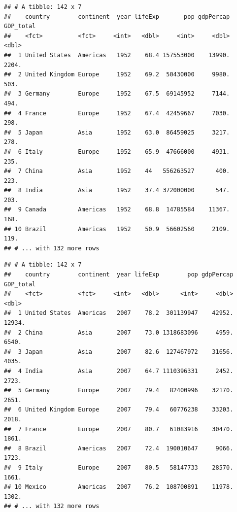 \documentclass[11pt,]{article}
\newenvironment{Shaded}{\begin{snugshade}}{\end{snugshade}}
\newcommand{\KeywordTok}[1]{\textcolor[rgb]{0.13,0.29,0.53}{\textbf{#1}}}
\newcommand{\DecValTok}[1]{\textcolor[rgb]{0.00,0.00,0.81}{#1}}
\newcommand{\StringTok}[1]{\textcolor[rgb]{0.31,0.60,0.02}{#1}}
\newcommand{\OperatorTok}[1]{\textcolor[rgb]{0.81,0.36,0.00}{\textbf{#1}}}
\newcommand{\NormalTok}[1]{#1}
\begin{document}
\begin{verbatim}
## # A tibble: 142 x 7
##    country        continent  year lifeExp       pop gdpPercap GDP_total
##    <fct>          <fct>     <int>   <dbl>     <int>     <dbl>     <dbl>
##  1 United States  Americas   1952    68.4 157553000    13990.     2204.
##  2 United Kingdom Europe     1952    69.2  50430000     9980.      503.
##  3 Germany        Europe     1952    67.5  69145952     7144.      494.
##  4 France         Europe     1952    67.4  42459667     7030.      298.
##  5 Japan          Asia       1952    63.0  86459025     3217.      278.
##  6 Italy          Europe     1952    65.9  47666000     4931.      235.
##  7 China          Asia       1952    44   556263527      400.      223.
##  8 India          Asia       1952    37.4 372000000      547.      203.
##  9 Canada         Americas   1952    68.8  14785584    11367.      168.
## 10 Brazil         Americas   1952    50.9  56602560     2109.      119.
## # ... with 132 more rows
\end{verbatim}

\begin{Shaded}
\end{Shaded}

\begin{verbatim}
## # A tibble: 142 x 7
##    country        continent  year lifeExp        pop gdpPercap GDP_total
##    <fct>          <fct>     <int>   <dbl>      <int>     <dbl>     <dbl>
##  1 United States  Americas   2007    78.2  301139947    42952.    12934.
##  2 China          Asia       2007    73.0 1318683096     4959.     6540.
##  3 Japan          Asia       2007    82.6  127467972    31656.     4035.
##  4 India          Asia       2007    64.7 1110396331     2452.     2723.
##  5 Germany        Europe     2007    79.4   82400996    32170.     2651.
##  6 United Kingdom Europe     2007    79.4   60776238    33203.     2018.
##  7 France         Europe     2007    80.7   61083916    30470.     1861.
##  8 Brazil         Americas   2007    72.4  190010647     9066.     1723.
##  9 Italy          Europe     2007    80.5   58147733    28570.     1661.
## 10 Mexico         Americas   2007    76.2  108700891    11978.     1302.
## # ... with 132 more rows
\end{verbatim}
\end{document}
